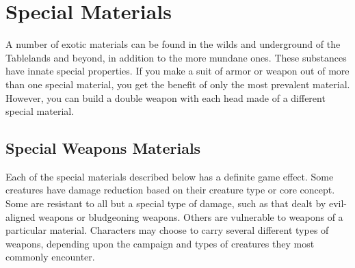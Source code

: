 \section{Special Materials}
A number of exotic materials can be found in the wilds and underground of the Tablelands and beyond, in addition to the more mundane ones. These substances have innate special properties. If you make a suit of armor or weapon out of more than one special material, you get the benefit of only the most prevalent material. However, you can build a double weapon with each head made of a different special material.

\subsection{Special Weapons Materials}
Each of the special materials described below has a definite game effect. Some creatures have damage reduction based on their creature type or core concept. Some are resistant to all but a special type of damage, such as that dealt by evil-aligned weapons or bludgeoning weapons. Others are vulnerable to weapons of a particular material. Characters may choose to carry several different types of weapons, depending upon the campaign and types of creatures they most commonly encounter.

